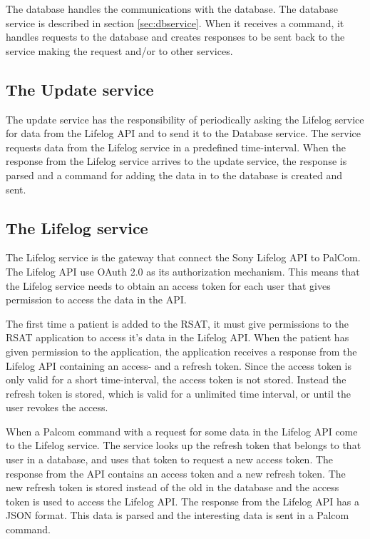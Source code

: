 \documentclass{cslthse-msc}
\begin{document}
The database handles the communications with the database. The database service is described in section \ref{sec:dbservice}. When it receives a command, it handles requests to the database and creates responses to be sent back to the service making the request and/or to other services. 


\subsection{The Update service}

The update service has the responsibility of periodically asking the Lifelog service for data from the Lifelog API and to send it to the Database service. The service requests data from the Lifelog service in a predefined time-interval. When the response from the Lifelog service arrives to the update service, the response is parsed and a command for adding the data in to the database is created and sent.


\subsection{The Lifelog service}

The Lifelog service is the gateway that connect the Sony Lifelog API to PalCom. The Lifelog API use OAuth 2.0 as its authorization mechanism. This means that the Lifelog service needs to obtain an access token for each user that gives permission to access the data in the API. 

The first time a patient is added to the RSAT, it must give permissions to the RSAT application to access it’s data in the Lifelog API. When the patient has given permission to the application, the application receives a response from the Lifelog API containing an access- and a refresh token. Since the access token is only valid for a short time-interval, the access token is not stored. Instead the refresh token is stored, which is valid for a unlimited time interval, or until the user revokes the access. 

When a Palcom command with a request for some data in the Lifelog API come to the Lifelog service. The service looks up the refresh token that belongs to that user in a database, and uses that token to request a new access token. The response from the API contains an access token and a new refresh token. The new refresh token is stored instead of the old in the database and the access token is used to access the Lifelog API. The response from the Lifelog API has a JSON format. This data is parsed and the interesting data is sent in a Palcom command. 
\end{document}

